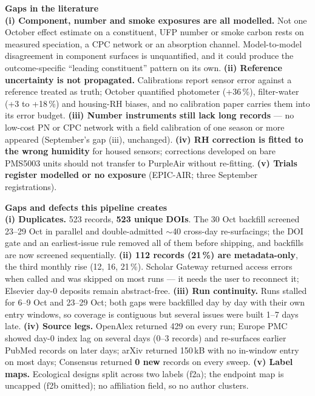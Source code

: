 \documentclass[10pt]{article}
\begin{document}
\begin{keybox}
{\sffamily\bfseries\footnotesize\color{Deep}Gaps in the literature}\\[1.2mm]
\footnotesize
\textbf{(i) Component, number and smoke exposures are all modelled.} Not one October effect estimate on a
constituent, UFP number or smoke carbon rests on measured speciation, a CPC network or an absorption
channel. Model-to-model disagreement in component surfaces is unquantified, and it could produce the
outcome-specific ``leading constituent'' pattern on its own.
\textbf{(ii) Reference uncertainty is not propagated.} Calibrations report sensor error against a
reference treated as truth; October quantified photometer (+36\,\%), filter-water (+3 to +18\,\%) and
housing-RH biases, and no calibration paper carries them into its error budget.
\textbf{(iii) Number instruments still lack long records} --- no low-cost PN or CPC network with a
field calibration of one season or more appeared (September's gap (iii), unchanged).
\textbf{(iv) RH correction is fitted to the wrong humidity} for housed sensors; corrections developed on
bare PMS5003 units should not transfer to PurpleAir without re-fitting.
\textbf{(v) Trials register modelled or no exposure} (EPIC-AIR; three September registrations).
\end{keybox}

\vspace{2.5mm}

\begin{keybox}
{\sffamily\bfseries\footnotesize\color{Deep}Gaps and defects this pipeline creates}\\[1.2mm]
\footnotesize
\textbf{(i) Duplicates.} 523 records, \textbf{523 unique DOIs}. The 30 Oct backfill screened 23--29 Oct in
parallel and double-admitted $\sim$40 cross-day re-surfacings; the DOI gate and an earliest-issue rule
removed all of them before shipping, and backfills are now screened sequentially.
\textbf{(ii) 112 records (21\,\%) are metadata-only}, the third monthly rise (12, 16, 21\,\%). Scholar
Gateway returned access errors when called and was skipped on most runs --- it needs the user to reconnect it; Elsevier day-0 deposits
remain abstract-free.
\textbf{(iii) Run continuity.} Runs stalled for 6--9 Oct and 23--29 Oct; both gaps were backfilled day by
day with their own entry windows, so coverage is contiguous but several issues were built 1--7 days late.
\textbf{(iv) Source legs.} OpenAlex returned 429 on every run; Europe PMC showed day-0 index lag on several
days (0--3 records) and re-surfaces earlier PubMed records on later days; arXiv returned 150\,kB with no
in-window entry on most days; Consensus returned \textbf{0 new} records on every sweep.
\textbf{(v) Label maps.} Ecological designs split across two labels (f2a); the endpoint map is uncapped
(f2b omitted); no affiliation field, so no author clusters.
\end{keybox}
\end{document}
